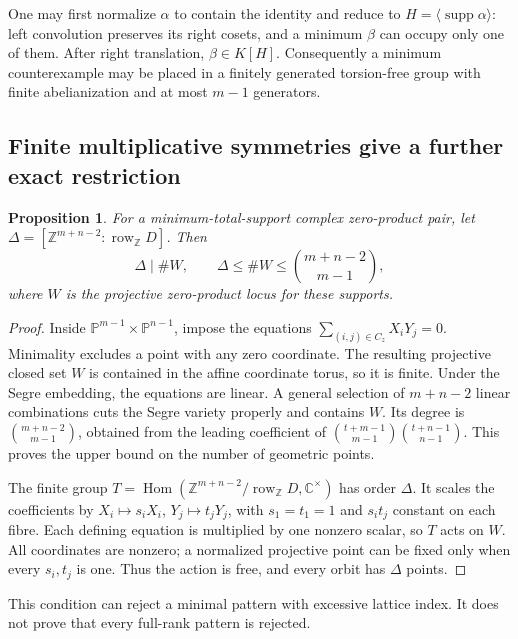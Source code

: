 \documentclass[11pt,a4paper,oneside]{report}
\newtheorem{proposition}[theorem]{Proposition}
\theoremstyle{definition}
\theoremstyle{remark}
\DeclareMathOperator{\supp}{supp}
\DeclareMathOperator{\Hom}{Hom}
\newcommand{\C}{\mathbb C}
\newcommand{\Z}{\mathbb Z}
\newcommand{\PP}{\mathbb P}
\begin{document}
One may first normalize $\alpha$ to contain the identity and reduce
to $H=\langle\supp\alpha\rangle$: left convolution preserves its
right cosets, and a minimum $\beta$ can occupy only one of them.
After right translation, $\beta\in K[H]$. Consequently a minimum
counterexample may be placed in a finitely generated torsion-free
group with finite abelianization and at most $m-1$ generators.

\subsection{Finite multiplicative symmetries give a further exact restriction}

\begin{proposition}\label{M08:prop:index}
For a minimum-total-support complex zero-product pair, let
$\Delta=[\Z^{m+n-2}:\operatorname{row}_{\Z}D]$. Then
\begin{equation}\label{M08:eq:delta}
\boxed{\Delta\mid\#W,\qquad
\Delta\le\#W\le\binom{m+n-2}{m-1},}
\end{equation}
where $W$ is the projective zero-product locus for these supports.
\end{proposition}
\begin{proof}
Inside $\PP^{m-1}\times\PP^{n-1}$, impose the equations
$\sum_{(i,j)\in C_z}X_iY_j=0$. Minimality excludes a point
with any zero coordinate. The resulting projective closed set
$W$ is contained in the affine coordinate torus, so it is finite.
Under the Segre embedding, the equations are linear. A general
selection of $m+n-2$ linear combinations cuts the Segre variety
properly and contains $W$. Its degree is
$\binom{m+n-2}{m-1}$, obtained from the leading coefficient
of $\binom{t+m-1}{m-1}\binom{t+n-1}{n-1}$.
This proves the upper bound on the number of geometric points.

The finite group
$T=\Hom(\Z^{m+n-2}/\operatorname{row}_{\Z}D,\C^\times)$
has order $\Delta$. It scales the coefficients by
$X_i\mapsto s_iX_i$, $Y_j\mapsto t_jY_j$, with $s_1=t_1=1$
and $s_it_j$ constant on each fibre. Each defining equation
is multiplied by one nonzero scalar, so $T$ acts on $W$.
All coordinates are nonzero; a normalized projective point
can be fixed only when every $s_i,t_j$ is one. Thus the action
is free, and every orbit has $\Delta$ points.
\end{proof}

This condition can reject a minimal pattern with excessive lattice
index. It does not prove that every full-rank pattern is rejected.
\end{document}
